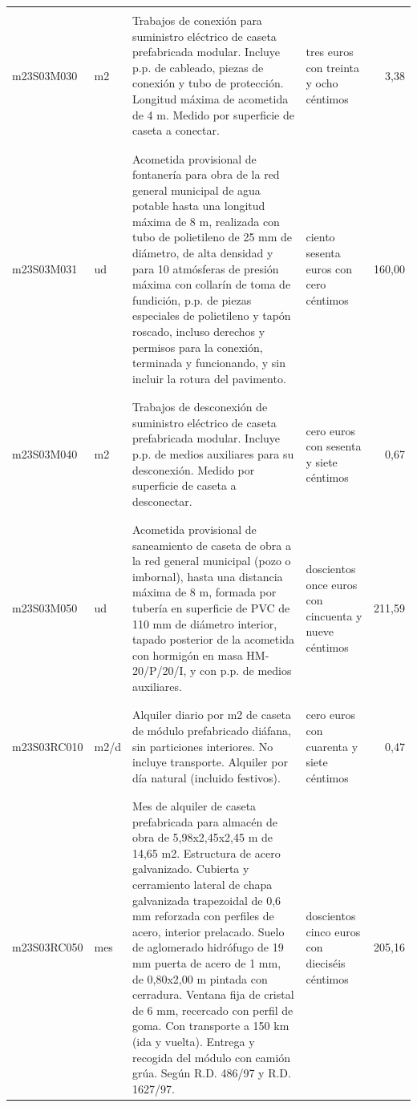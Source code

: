 \documentclass{book}%
\begin{document}
\begin{supertabular}{|l|l|p{5cm}|p{3cm}|r|}
&&&&\\%
m23S03M030&m2&Trabajos de conexión para suministro eléctrico de caseta prefabricada modular. Incluye p.p. de cableado, piezas de conexión y tubo de protección. Longitud máxima de acometida de 4 m. Medido por superficie de caseta a conectar.&tres euros con treinta y ocho céntimos&3,38\\%
&&&&\\%
&&&&\\%
m23S03M031&ud&Acometida provisional de fontanería para obra de la red general municipal de agua potable hasta una longitud máxima de 8 m, realizada con tubo de polietileno de 25 mm de diámetro, de alta densidad y para 10 atmósferas de presión máxima con collarín de toma de fundición, p.p. de piezas especiales de polietileno y tapón roscado, incluso derechos y permisos para la conexión, terminada y funcionando, y sin incluir la rotura del pavimento.&ciento sesenta euros con cero céntimos&160,00\\%
&&&&\\%
&&&&\\%
m23S03M040&m2&Trabajos de desconexión de suministro eléctrico de caseta prefabricada modular. Incluye p.p. de medios auxiliares para su desconexión. Medido por superficie de caseta a desconectar.&cero euros con sesenta y siete céntimos&0,67\\%
&&&&\\%
&&&&\\%
m23S03M050&ud&Acometida provisional de saneamiento de caseta de obra a la red general municipal (pozo o imbornal), hasta una distancia máxima de 8 m, formada por tubería en superficie de PVC de 110 mm de diámetro interior, tapado posterior de la acometida con hormigón en masa HM{-}20/P/20/I, y con p.p. de medios auxiliares.&doscientos once euros con cincuenta y nueve céntimos&211,59\\%
&&&&\\%
&&&&\\%
m23S03RC010&m2/d&Alquiler diario por m2 de caseta de módulo prefabricado diáfana, sin particiones interiores. No incluye transporte. Alquiler por día natural (incluido festivos).&cero euros con cuarenta y siete céntimos&0,47\\%
&&&&\\%
&&&&\\%
m23S03RC050&mes&Mes de alquiler de caseta prefabricada para almacén de obra de 5,98x2,45x2,45 m de 14,65 m2. Estructura de acero galvanizado. Cubierta y cerramiento lateral de chapa galvanizada trapezoidal de 0,6 mm reforzada con perfiles de acero, interior prelacado. Suelo de aglomerado hidrófugo de 19 mm puerta de acero de 1 mm, de 0,80x2,00 m pintada con cerradura. Ventana fija de cristal de 6 mm, recercado con perfil de goma. Con transporte a 150 km (ida y vuelta). Entrega y recogida del módulo con camión grúa. Según R.D. 486/97 y R.D. 1627/97.&doscientos cinco euros con dieciséis céntimos&205,16\\%

\end{supertabular}
\end{document}
